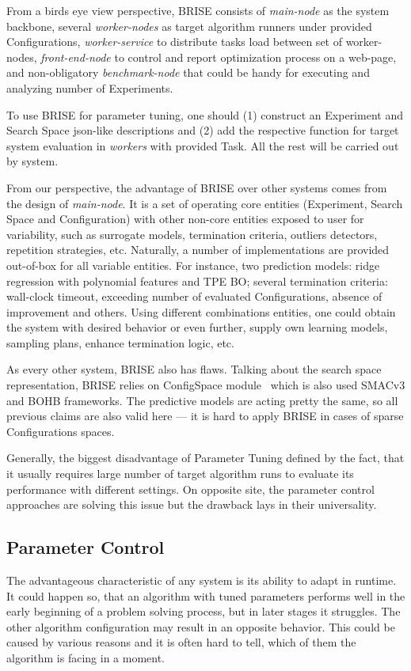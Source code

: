 From a birds eye view perspective, BRISE consists of \textit{main-node} as the system backbone, several \textit{worker-nodes} as target algorithm runners under provided Configurations, \textit{worker-service} to distribute tasks load between set of worker-nodes, \textit{front-end-node} to control and report optimization process on a web-page, and non-obligatory \textit{benchmark-node} that could be handy for executing and analyzing number of Experiments.

To use BRISE for parameter tuning, one should (1) construct an Experiment and Search Space json-like descriptions and (2) add the respective function for target system evaluation in \textit{workers} with provided Task. All the rest will be carried out by system.

From our perspective, the advantage of BRISE over other systems comes from the design of \textit{main-node}. It is a set of operating core entities (Experiment, Search Space and Configuration) with other non-core entities exposed to user for variability, such as surrogate models, termination criteria, outliers detectors, repetition strategies, etc. Naturally, a number of implementations are provided out-of-box for all variable entities. For instance, two prediction models: ridge regression with polynomial features and TPE BO; several termination criteria: wall-clock timeout, exceeding number of evaluated Configurations, absence of improvement and others. Using different combinations entities, one could obtain the system with desired behavior or even further, supply own learning models, sampling plans, enhance termination logic, etc.

As every other system, BRISE also has flaws. Talking about the search space representation, BRISE relies on ConfigSpace module~\cite{configspace} which is also used SMACv3 and BOHB frameworks. The predictive models are acting pretty the same, so all previous claims are also valid here — it is hard to apply BRISE in cases of sparse Configurations spaces.


Generally, the biggest disadvantage of Parameter Tuning defined by the fact, that it usually requires large number of target algorithm runs to evaluate its performance with different settings.
On opposite site, the parameter control approaches are solving this issue but the drawback lays in their universality.


\subsection{Parameter Control}\label{bg: parameter control}
The advantageous characteristic of any system is its ability to adapt in runtime.
It could happen so, that an algorithm with tuned parameters performs well in the early beginning of a problem solving process, but in later stages it struggles. The other algorithm configuration may result in an opposite behavior. This could be caused by various reasons and it is often hard to tell, which of them the algorithm is facing in a moment. 

